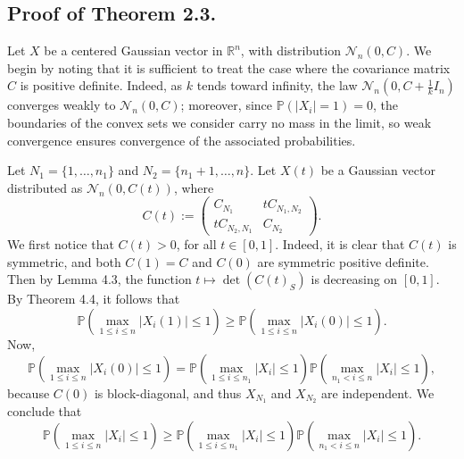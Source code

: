 \documentclass[12pt]{article}
\begin{document}
\subsection{Proof of Theorem 2.3.}

Let $X$ be a centered Gaussian vector in $\mathbb{R}^n$, with distribution $\mathcal{N}_n(0, C)$. We begin by noting that it is sufficient to treat the case where the covariance matrix $C$ is positive definite. Indeed, as $k$ tends toward infinity, the law $\mathcal{N}_n\left(0, C + \frac{1}{k}I_n\right)$ converges weakly to $\mathcal{N}_n(0, C)$; moreover, since $\mathbb{P}(|X_i| = 1) = 0$, the boundaries of the convex sets we consider carry no mass in the limit, so weak convergence ensures convergence of the associated probabilities.

Let $N_1 = \{1, \ldots, n_1\}$ and $N_2 = \{n_1 + 1, \ldots, n\}$.
Let $X(t)$ be a Gaussian vector distributed as $\mathcal{N}_n(0, C(t))$, where
\[
C(t) :=
\begin{pmatrix}
C_{N_1} & tC_{N_1,N_2} \\
tC_{N_2,N_1} & C_{N_2}
\end{pmatrix}.
\]
We first notice that $C(t) > 0$, for all $t \in [0,1]$.
Indeed, it is clear that $C(t)$ is symmetric, and both $C(1) = C$ and $C(0)$ are symmetric positive definite. Then by Lemma 4.3, the function $t \mapsto \det(C(t)_S)$ is decreasing on $[0,1]$.
By Theorem 4.4, it follows that
\[
\mathbb{P}\left( \max_{1 \leq i \leq n} |X_i(1)| \leq 1 \right) \geq \mathbb{P}\left( \max_{1 \leq i \leq n} |X_i(0)| \leq 1 \right).
\]
Now,
\[
\mathbb{P}\left( \max_{1 \leq i \leq n} |X_i(0)| \leq 1 \right)
=
\mathbb{P}\left( \max_{1 \leq i \leq n_1} |X_i| \leq 1 \right)
\mathbb{P}\left( \max_{n_1 < i \leq n} |X_i| \leq 1 \right),
\]
because $C(0)$ is block-diagonal, and thus $X_{N_1}$ and $X_{N_2}$ are independent.
We conclude that
\[
\mathbb{P}\left( \max_{1 \leq i \leq n} |X_i| \leq 1 \right)
\geq
\mathbb{P}\left( \max_{1 \leq i \leq n_1} |X_i| \leq 1 \right)
\mathbb{P}\left( \max_{n_1 < i \leq n} |X_i| \leq 1 \right).
\]

\newpage
\end{document}
